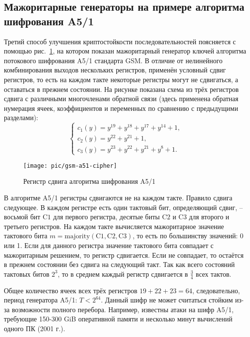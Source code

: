 \subsection[Мажоритарные генераторы, шифр A5/1]{Мажоритарные генераторы на примере алгоритма шифрования A5/1}\label{section:majority_generators}

Третий способ улучшения криптостойкости последовательностей поясняется с помощью рис.~\ref{fig:gsm-a51-cipher}, на котором показан мажоритарный генератор ключей алгоритма потокового шифрования A5/1 стандарта GSM. В отличие от нелинейного комбинирования выходов нескольких регистров, применён условный сдвиг регистров, то есть на каждом такте некоторые регистры могут не сдвигаться, а оставаться в прежнем состоянии. На рисунке показана схема из трёх регистров сдвига с различными многочленами обратной связи (здесь применена обратная нумерация ячеек, коэффициентов и переменных по сравнению с предыдущими разделами):
\[ \left\{ \begin{array}{l}
    c_1(y) = y^{19} + y^{18} + y^{17} + y^{14} + 1, \\
    c_2(y) = y^{22} + y^{21} + 1, \\
    c_3(y) = y^{23} + y^{22} + y^{21} + y^8 + 1.
\end{array} \right. \]

\begin{figure}[!ht]
    \centering
	\texttt{[image: pic/gsm-a51-cipher]}
    \caption{Регистр сдвига алгоритма шифрования A5/1\label{fig:gsm-a51-cipher}}
\end{figure}

В алгоритме A5/1 регистры сдвигаются не на каждом такте. Правило сдвига следующее. В каждом регистре есть один тактовый бит, определяющий сдвиг, -- восьмой бит $\textrm{C1}$ для первого регистра, десятые биты $\textrm{C2}$ и $\textrm{C3}$ для второго и третьего регистров. На каждом такте вычисляется мажоритарное значение тактового бита $m = \textrm{majority}(\textrm{C1}, \textrm{C2}, \textrm{C3})$, то есть по большинству значений: 0 или 1. Если для данного регистра значение тактового бита совпадает с мажоритарным решением, то регистр сдвигается. Если не совпадает, то остаётся в прежнем состоянии без сдвига на следующий такт. Так как всего состояний тактовых битов $2^3$, то в среднем каждый регистр сдвигается в $\frac{3}{4}$ всех тактов.

Общее количество ячеек всех трёх регистров $19+22+23=64$, следовательно, период генератора A5/1: $T < 2^{64}$. Данный шифр не может считаться стойким из-за возможности полного перебора. Например, известны атаки на шифр A5/1, требующие 150-300 GiB оперативной памяти и несколько минут вычислений одного ПК (2001 г.).
